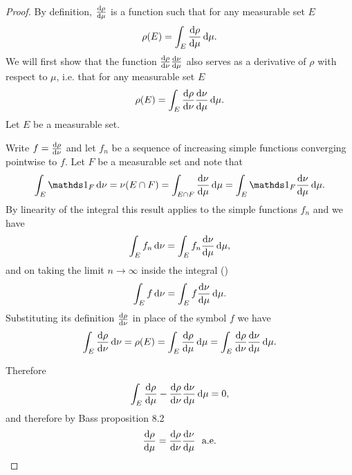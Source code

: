 \begin{proof}
  By definition, $\frac{\d\rho}{\d\mu}$ is a function such that for any measurable set $E$
  \begin{align*}
    \rho(E) = \int_E \frac{\d\rho}{\d\mu} \d\mu.
  \end{align*}
  We will first show that the function $\frac{\d\rho}{\d\nu}\frac{\d\nu}{\d\mu}$ also serves as a derivative
  of $\rho$ with respect to $\mu$, i.e. that for any measurable set $E$
  \begin{align*}
    \rho(E) = \int_E \frac{\d\rho}{\d\nu}\frac{\d\nu}{\d\mu} \d\mu.
  \end{align*}
  Let $E$ be a measurable set.

  Write $f = \frac{\d\rho}{\d\nu}$ and let $f_n$ be a sequence of increasing simple functions converging
  pointwise to $f$. Let $F$ be a measurable set and note that
  \begin{align*}
    \int_E \ind_F \d\nu
    = \nu(E \cap F)
    = \int_{E \cap F} \frac{\d\nu}{\d\mu} \d\mu
    = \int_E \ind_F \frac{\d\nu}{\d\mu} \d\mu.
  \end{align*}
  By linearity of the integral this result applies to the simple functions $f_n$ and we have
  \begin{align*}
    \int_E f_n \d\nu = \int_{E} f_n \frac{\d\nu}{\d\mu}\d\mu,
  \end{align*}
  and on taking the limit $n \to \infty$ inside the integral ()
  \begin{align*}
    \int_E f \d\nu = \int_{E} f \frac{\d\nu}{\d\mu}\d\mu.
  \end{align*}
  Substituting its definition $\frac{\d\rho}{\d\nu}$ in place of the symbol $f$ we have
  \begin{align*}
    \int_E \frac{\d\rho}{\d\nu} \d\nu
    = \rho(E)
    = \int_E \frac{\d\rho}{\d\mu} \d\mu
    = \int_{E} \frac{\d\rho}{\d\nu} \frac{\d\nu}{\d\mu}\d\mu.
  \end{align*}

  Therefore
  \begin{align*}
    \int_E \frac{\d\rho}{\d\mu}  - \frac{\d\rho}{\d\nu}\frac{\d\nu}{\d\mu} \d\mu = 0,
  \end{align*}
  and therefore by Bass proposition 8.2
  \begin{align*}
    \frac{\d\rho}{\d\mu} = \frac{\d\rho}{\d\nu}\frac{\d\nu}{\d\mu} \ae
  \end{align*}
\end{proof}

